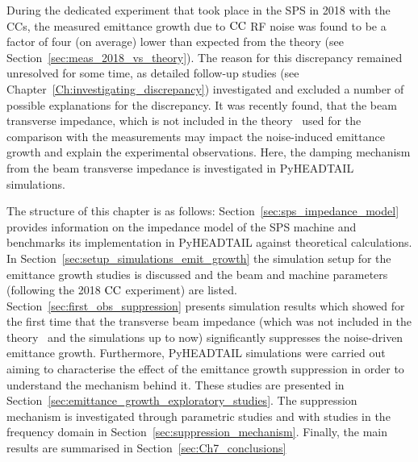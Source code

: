 During the dedicated experiment that took place in the SPS
in 2018 with the CCs, the measured emittance
growth due to ${\mathrm{CC}}$ RF noise was found to be a factor of four (on average) lower than
expected from the theory (see Section~\ref{sec:meas_2018_vs_theory}). The reason for this discrepancy remained unresolved for some time, as detailed follow-up studies (see Chapter~\ref{Ch:investigating_discrepancy}) investigated and excluded a number of possible explanations for the discrepancy.
It was recently found, that the beam transverse impedance, which is not included in the theory~\cite{PhysRevSTAB.18.101001} used for the comparison with the measurements may impact the noise-induced emittance growth and explain the experimental observations. Here, the damping mechanism from the beam transverse impedance is investigated in PyHEADTAIL simulations.

The structure of this chapter is as follows: Section~\ref{sec:sps_impedance_model} provides information on the impedance model of the SPS machine and benchmarks its implementation in PyHEADTAIL against theoretical calculations. In Section~\ref{sec:setup_simulations_emit_growth} the simulation setup for the emittance growth studies is discussed and the beam and machine parameters (following the 2018 ${\mathrm{CC}}$ experiment) are listed. Section~\ref{sec:first_obs_suppression} presents simulation results which showed for the first time that the transverse beam impedance (which was not included in the theory~\cite{PhysRevSTAB.18.101001} and the simulations up to now) significantly suppresses the noise-driven emittance growth. Furthermore, PyHEADTAIL simulations were carried out aiming to characterise the effect of the emittance growth suppression in order to understand the mechanism behind it. These studies are presented in Section~\ref{sec:emittance_growth_exploratory_studies}. The suppression mechanism is investigated through parametric studies and with studies in the frequency domain in Section~\ref{sec:suppression_mechanism}. Finally, the main results are summarised in Section~\ref{sec:Ch7_conclusions}


